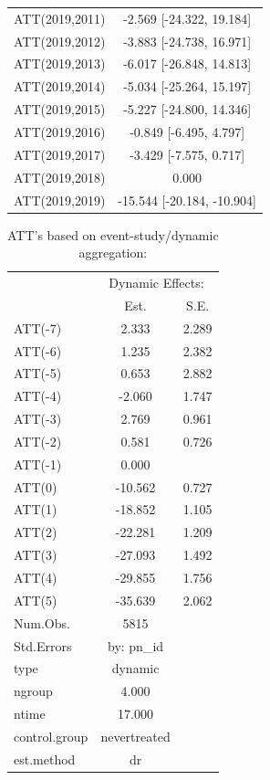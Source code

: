 \documentclass[
  12pt,
]{article}
\begin{document}
\begin{table}
\begin{tabular}[t]{lc}
ATT(2019,2011) & -2.569 [-24.322, 19.184]\\
ATT(2019,2012) & -3.883 [-24.738, 16.971]\\
ATT(2019,2013) & -6.017 [-26.848, 14.813]\\
ATT(2019,2014) & -5.034 [-25.264, 15.197]\\
ATT(2019,2015) & -5.227 [-24.800, 14.346]\\
ATT(2019,2016) & -0.849 [-6.495, 4.797]\\
ATT(2019,2017) & -3.429 [-7.575, 0.717]\\
ATT(2019,2018) & 0.000\\
ATT(2019,2019) & -15.544 [-20.184, -10.904]\\
\bottomrule
\end{tabular}
\end{table}

\begin{table}

\caption{\label{tab:Tab-7}ATT's based on event-study/dynamic aggregation:}
\centering
\begin{tabular}[t]{lcc}
\toprule
\multicolumn{1}{c}{ } & \multicolumn{2}{c}{Dynamic Effects:} \\
\cmidrule(l{3pt}r{3pt}){2-3}
  & Est. & S.E.\\
\midrule
ATT(-7) & 2.333 & 2.289\\
ATT(-6) & 1.235 & 2.382\\
ATT(-5) & 0.653 & 2.882\\
ATT(-4) & -2.060 & 1.747\\
ATT(-3) & 2.769 & 0.961\\
ATT(-2) & 0.581 & 0.726\\
ATT(-1) & 0.000 & \\
ATT(0) & -10.562 & 0.727\\
ATT(1) & -18.852 & 1.105\\
ATT(2) & -22.281 & 1.209\\
ATT(3) & -27.093 & 1.492\\
ATT(4) & -29.855 & 1.756\\
ATT(5) & -35.639 & 2.062\\
\midrule
Num.Obs. & 5815 & \\
Std.Errors & by: pn\_id & \\
type & dynamic & \\
ngroup & 4.000 & \\
ntime & 17.000 & \\
control.group & nevertreated & \\
est.method & dr & \\
\bottomrule
\end{tabular}
\end{table}
\end{document}

